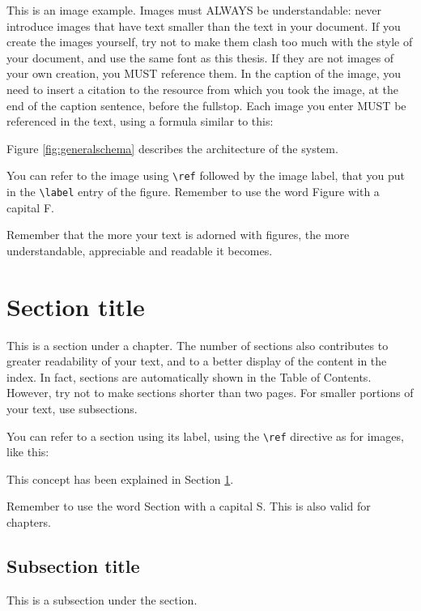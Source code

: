 This is an image example. Images must ALWAYS be understandable: never introduce images that have text smaller than the text in your document. If you create the images yourself, try not to make them clash too much with the style of your document, and use the same font as this thesis.
If they are not images of your own creation, you MUST reference them. In the caption of the image, you need to insert a citation to the resource from which you took the image, at the end of the caption sentence, before the fullstop.
Each image you enter MUST be referenced in the text, using a formula similar to this:

\begin{center}
	Figure \ref{fig:generalschema} describes the architecture of the system.
\end{center}

You can refer to the image using \lstinline{\ref} followed by the image label, that you put in the \lstinline{\label} entry of the figure. Remember to use the word Figure with a capital F.

Remember that the more your text is adorned with figures, the more understandable, appreciable and readable it becomes.

\section{Section title}\label{examplesection}
This is a section under a chapter. The number of sections also contributes to greater readability of your text, and to a better display of the content in the index. In fact, sections are automatically shown in the Table of Contents. However, try not to make sections shorter than two pages. For smaller portions of your text, use subsections.

You can refer to a section using its label, using the \lstinline{\ref} directive as for images, like this:

\begin{center}
	This concept has been explained in Section \ref{examplesection}.
\end{center}

Remember to use the word Section with a capital S. This is also valid for chapters.

\subsection{Subsection title}
This is a subsection under the section.

